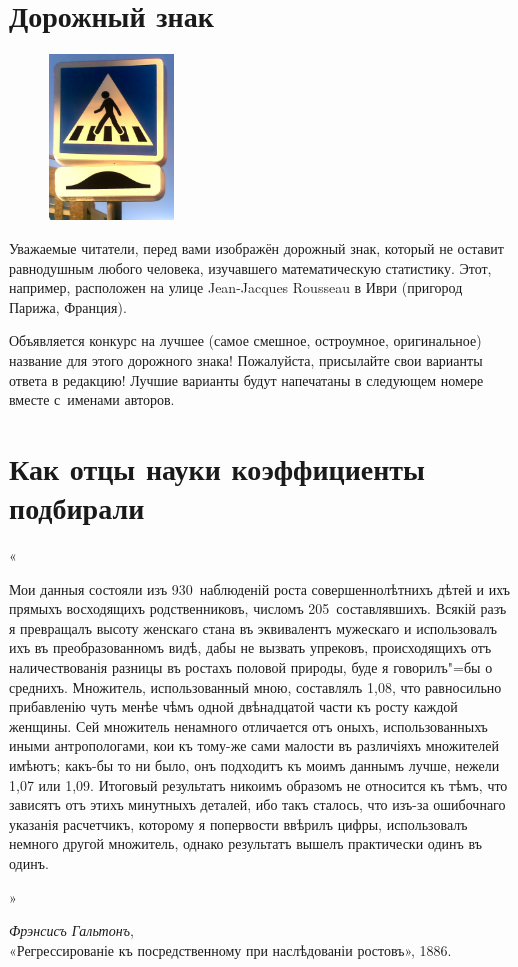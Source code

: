 \documentclass[11pt]{article}
\date{\vspace{-5ex}}
\begin{document}
	
	
	\AUTHOR{}{}
	\SHORTAUTHOR{}
	
\DoFirstPageTechnicalStuff

\section{Дорожный знак}

\begin{figure}\centering\vspace{-2ex}
	\includegraphics[width=3.3cm]{Normal-warning2.jpg}\vspace{-3ex}
\end{figure}
Уважаемые читатели, перед вами изображён дорожный знак, который не оставит равнодушным любого человека, изучавшего математическую статистику. Этот, например, расположен на улице Jean-Jacques Rousseau в Иври (пригород Парижа, Франция).

Объявляется конкурс на лучшее (самое смешное, остроумное, оригинальное) название для этого дорожного знака! Пожалуйста, присылайте свои варианты ответа в редакцию! Лучшие варианты будут напечатаны в следующем номере вместе с~именами авторов.

	\section{Как отцы науки коэффициенты подбирали}

{\huge«}

Мои данныя состояли изъ 930~наблюденій роста совершеннолѣтнихъ дѣтей и ихъ прямыхъ восходящихъ родственниковъ, числомъ 205~составлявшихъ. Всякій разъ я превращалъ высоту женскаго стана въ эквивалентъ мужескаго и использовалъ ихъ въ преобразованномъ видѣ, дабы не вызвать упрековъ, происходящихъ отъ наличествованія разницы въ ростахъ половой природы, буде я говорилъ"=бы о среднихъ. Множитель, использованный мною, составлялъ 1,08, что равносильно прибавленію чуть менѣе чѣмъ одной двѣнадцатой части къ росту каждой женщины. Сей множитель ненамного отличается отъ оныхъ, использованныхъ иными антропологами, кои къ тому-же сами малости въ различіяхъ множителей имѣютъ; какъ-бы то ни было, онъ подходитъ къ моимъ даннымъ лучше, нежели 1,07 или 1,09. Итоговый результатъ никоимъ образомъ не относится къ тѣмъ, что зависятъ отъ этихъ минутныхъ деталей, ибо такъ сталось, что изъ-за ошибочнаго указанія расчетчикъ, которому я попервости ввѣрилъ цифры, использовалъ немного другой множитель, однако результатъ вышелъ практически одинъ въ одинъ. 

{\hfill \huge»}
\begin{flushright}
	\textit{Фрэнсисъ Гальтонъ}, \\
	«Регрессированіе къ посредственному при наслѣдованіи ростовъ», 1886.
\end{flushright}
	

	
\end{document}
